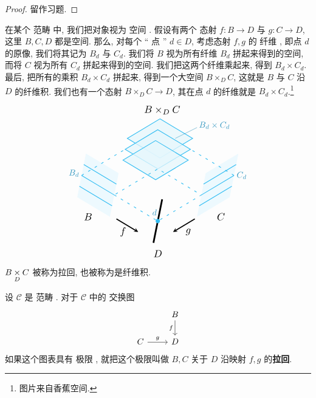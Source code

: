 \begin{proof}
    留作习题.
\end{proof}
\begin{example}
    在某个 范畴 中, 我们把对象视为 空间 .
    假设有两个 态射  $f \colon B \to D$ 与 $g \colon C \to D$,
    这里 $B, C, D$ 都是空间.
    那么, 对每个 `` 点 '' $d \in D$,
    考虑态射 $f, g$ 的 纤维 , 即点 $d$ 的原像, 我们将其记为 $B_d$ 与 $C_d$.
    我们将 $B$ 视为所有纤维 $B_d$ 拼起来得到的空间,
    而将 $C$ 视为所有 $C_d$ 拼起来得到的空间.
    我们把这两个纤维乘起来, 得到 $B_d \times C_d$.
    最后, 把所有的乘积 $B_d \times C_d$ 拼起来, 得到一个大空间 $B \times_D C$,
    这就是 $B$ 与 $C$ 沿 $D$ 的纤维积.
    我们也有一个态射 $B \times_D C \to D$,
    其在点 $d$ 的纤维就是 $B_d \times C_d$.\footnote{图片来自香蕉空间.}
    \[\begin{tikzpicture}[scale=.9]
        \draw [line width=2] (0, 0) -- (-.4, -2);
        \fill [cyan!7]
            (-2, 1.2) -- (-2.4, -.8) -- (-3.9, .1) -- (-3.5, 2.1);
        \fill [cyan!7]
            (2, 1.2) -- (1.6, -.8) -- (3.1, .1) -- (3.5, 2.1);
        \foreach \i in {1, ..., 3} {
            \draw [thick, cyan!80] 
                (-3.5 - .1 * \i, 2.1 - .5 * \i) -- (-2 - .1 * \i, 1.2 - .5 * \i)
                (3.5 - .1 * \i, 2.1 - .5 * \i) -- (2 - .1 * \i, 1.2 - .5 * \i);
        }
        \foreach \i in {1, ..., 3} {
            \draw [thick, cyan!80, fill=cyan!10, fill opacity=.75] 
                (-.1 * \i, 4.2 - .5 * \i) -- (1.5 - .1 * \i, 3.3 - .5 * \i) --
                (-.1 * \i, 2.4 - .5 * \i) -- (-1.5 - .1 * \i, 3.3 - .5 * \i) -- cycle;
        }
        \draw [thick, cyan!80, loosely dashed]
            (-2.2, .2) -- (-.2, -1) -- (1.8, .2) -- (-.2, 1.4) -- cycle
            (-3.7, 1.1) -- (-1.7, 2.3)
            (3.3, 1.1) -- (1.3, 2.3);
        \fill [cyan!80] (-.2, -1) circle (.1);
        \draw [line width=1.2, -stealth] (-2.1, -.9) -- (-1.1, -1.5);
        \draw [line width=1.2, -stealth] (1.5, -.9) -- (.5, -1.5);
        \node [cyan!75!black] at (-.35, -.6) {$d$};
        \node [scale=1.2] at (-.2, -2.5) {$D$};
        \node [scale=1.2] at (-3.4, -.8) {$B$};
        \node [scale=1.2] at (2.7, -.8) {$C$};
        \node [scale=1.2] at (-1.8, -1.5) {$f$};
        \node [scale=1.2] at (1.2, -1.5) {$g$};
        \node [scale=1.2] at (0, 4.1) {$B \times_D C$};
        \node [cyan!75!black] at (-4.05, 1.2) {$B_d$};
        \node [cyan!75!black] at (3.65, 1.1) {$C_d$};
        \node [cyan!75!black] at (2.4, 3.4) {$B_d \times C_d$};
        \draw [cyan!75!black] (1.6, 3.3) -- (.6, 2.8);
    \end{tikzpicture}\]
    $B \underset{D}{\times} C$ 被称为拉回, 也被称为是纤维积.
    \begin{definition} [拉回, 纤维积]
    \label{拉回}
    设 $\mathcal{C}$ 是 范畴 .
    对于 $\mathcal{C}$ 中的 交换图
    \[\begin{tikzcd}
	& B \\
	C & D
	\arrow["f"', from=1-2, to=2-2]
	\arrow["g", from=2-1, to=2-2]
    \end{tikzcd}\]
    如果这个图表具有 极限 ,
    就把这个极限叫做 $B, C$ 关于 $D$ 沿映射 $f, g$ 的\textbf{拉回}.


\end{definition}
\end{example}
